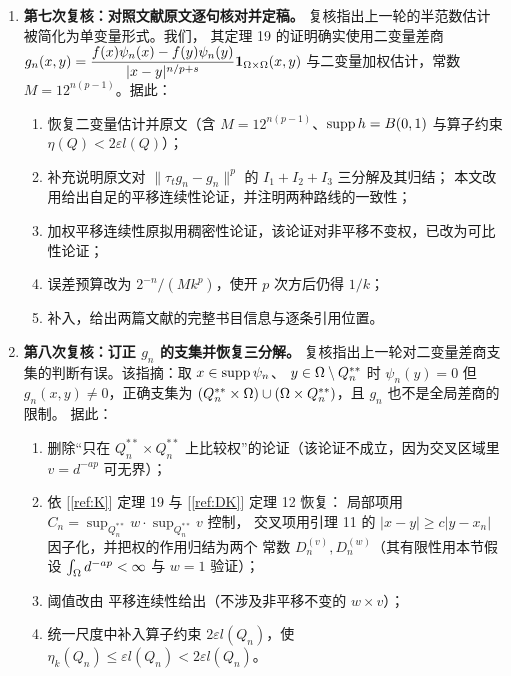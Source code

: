 \begin{enumerate}
\item \textbf{第七次复核：对照文献原文逐句核对并定稿。}
  复核指出上一轮的半范数估计被简化为单变量形式。我们，
  其定理 19 的证明确实使用二变量差商
  $g_n(x,y)=\dfrac{f(x)\psi_n(x)-f(y)\psi_n(y)}{|x-y|^{n/p+s}}\mathbf 1_{\Omega\times\Omega}(x,y)$
  与二变量加权估计，常数 $M=12^{n(p-1)}$。据此：
  \begin{enumerate}[label=(\arabic*)]
    \item 恢复二变量估计并原文（含 $M=12^{n(p-1)}$、$\operatorname{supp} h=B(0,1)$ 与算子约束
          $\eta(Q)<2\varepsilon l(Q)$）；
    \item 补充说明原文对 $\|\tau_tg_n-g_n\|^p$ 的 $I_1+I_2+I_3$ 三分解及其归结；
          本文改用给出自足的平移连续性论证，并注明两种路线的一致性；
    \item 加权平移连续性原拟用稠密性论证，该论证对非平移不变权，已改为可比性论证；
    \item 误差预算改为 $2^{-n}/(Mk^{p})$，使开 $p$ 次方后仍得 $1/k$；
    \item 补入，给出两篇文献的完整书目信息与逐条引用位置。
  \end{enumerate}

\item \textbf{第八次复核：订正 $g_n$ 的支集并恢复三分解。}
  复核指出上一轮对二变量差商支集的判断有误。该指摘：取 $x\in\operatorname{supp}\psi_n$、
  $y\in\Omega\setminus Q_n^{**}$ 时 $\psi_n(y)=0$ 但 $g_n(x,y)\ne0$，正确支集为
  $(Q_n^{**}\times\Omega)\cup(\Omega\times Q_n^{**})$，且 $g_n$ 也不是全局差商的限制。
  据此：
  \begin{enumerate}[label=(\arabic*)]
    \item 删除“只在 $Q_n^{**}\times Q_n^{**}$ 上比较权”的论证（该论证不成立，因为交叉区域里
          $v=d^{-ap}$ 可无界）；
    \item 依 [\ref{ref:K}] 定理 19 与 [\ref{ref:DK}] 定理 12 恢复：
          局部项用 $C_n=\sup_{Q_n^{**}}w\cdot\sup_{Q_n^{**}}v$ 控制，
          交叉项用引理 11 的 $|x-y|\ge c|y-x_n|$ 因子化，并把权的作用归结为两个
          常数 $D_n^{(v)},D_n^{(w)}$（其有限性用本节假设 $\int_\Omega d^{-ap}<\infty$ 与 $w=1$ 验证）；
    \item 阈值改由 平移连续性给出（不涉及非平移不变的 $w\times v$）；
    \item 统一尺度中补入算子约束 $2\varepsilon l(Q_n)$，使 $\eta_k(Q_n)\le\varepsilon l(Q_n)<2\varepsilon l(Q_n)$。
  \end{enumerate}


\end{enumerate}
